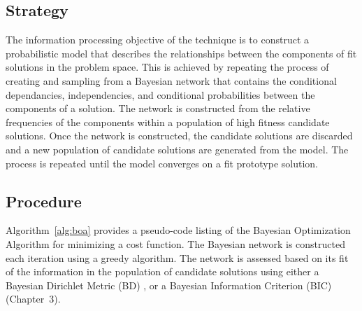 \subsection{Strategy}
The information processing objective of the technique is to construct a probabilistic model that describes the relationships between the components of fit solutions in the problem space.
This is achieved by repeating the process of creating and sampling from a Bayesian network that contains the conditional dependancies, independencies, and conditional probabilities between the components of a solution. The network is constructed from the relative frequencies of the components within a population of high fitness candidate solutions. Once the network is constructed, the candidate solutions are discarded and a new population of candidate solutions are generated from the model. The process is repeated until the model converges on a fit prototype solution.

\subsection{Procedure}
Algorithm~\ref{alg:boa} provides a pseudo-code listing of the Bayesian Optimization Algorithm for minimizing a cost function.
The Bayesian network is constructed each iteration using a greedy algorithm. The network is assessed based on its fit of the information in the population of candidate solutions using either a Bayesian Dirichlet Metric (BD) \cite{Pelikan1999a}, or a Bayesian Information Criterion (BIC) \cite{Pelikan2005} (Chapter~3).


